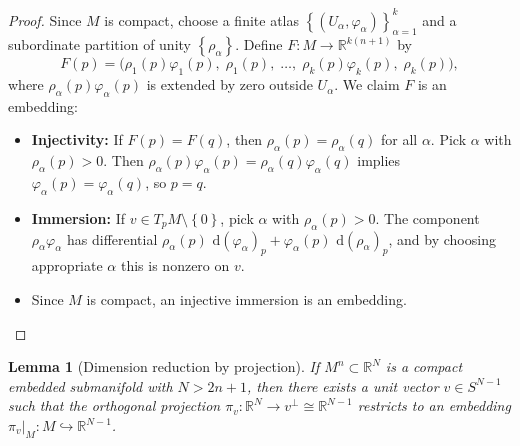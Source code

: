 \documentclass[12pt,a4paper,openany]{book}
\newtheorem{lemma}[theorem]{Lemma}
\theoremstyle{definition}
\theoremstyle{remark}
\newcommand{\R}{\mathbb{R}}
\newcommand{\dd}{\,\mathrm{d}}
\newcommand{\set}[1]{\left\{ #1 \right\}}
\begin{document}
\begin{proof}
Since $M$ is compact, choose a finite atlas $\set{(U_\alpha,\varphi_\alpha)}_{\alpha=1}^k$
and a subordinate partition of unity $\set{\rho_\alpha}$.
Define $F\colon M \to \R^{k(n+1)}$ by
\[
  F(p) = \bigl(\rho_1(p)\varphi_1(p),\;\rho_1(p),\;\dots,\;
  \rho_k(p)\varphi_k(p),\;\rho_k(p)\bigr),
\]
where $\rho_\alpha(p)\varphi_\alpha(p)$ is extended by zero outside $U_\alpha$.
We claim $F$ is an embedding:
\begin{itemize}
  \item \textbf{Injectivity:} If $F(p) = F(q)$, then $\rho_\alpha(p) = \rho_\alpha(q)$
    for all $\alpha$. Pick $\alpha$ with $\rho_\alpha(p) > 0$. Then
    $\rho_\alpha(p)\varphi_\alpha(p) = \rho_\alpha(q)\varphi_\alpha(q)$
    implies $\varphi_\alpha(p) = \varphi_\alpha(q)$, so $p = q$.
  \item \textbf{Immersion:} If $v \in T_pM\setminus\set{0}$, pick $\alpha$
    with $\rho_\alpha(p) > 0$. The component $\rho_\alpha\varphi_\alpha$ has
    differential $\rho_\alpha(p)\,\dd(\varphi_\alpha)_p + \varphi_\alpha(p)\,\dd(\rho_\alpha)_p$,
    and by choosing appropriate $\alpha$ this is nonzero on $v$.
  \item Since $M$ is compact, an injective immersion is an embedding.
    \qedhere
\end{itemize}
\end{proof}

\begin{lemma}[Dimension reduction by projection]\label{lem:dimension-reduction}
If $M^n \subset \R^N$ is a compact embedded submanifold with $N > 2n+1$,
then there exists a unit vector $v \in S^{N-1}$ such that the orthogonal
projection $\pi_v\colon \R^N \to v^\perp \cong \R^{N-1}$ restricts to
an embedding $\pi_v|_M\colon M \hookrightarrow \R^{N-1}$.
\end{lemma}
\end{document}
